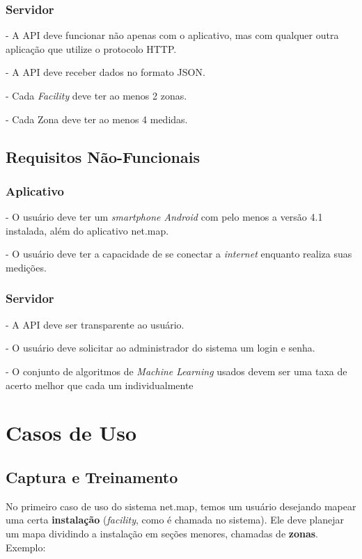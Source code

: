\subsubsection{Servidor}
- A API deve funcionar não apenas com o aplicativo, mas com qualquer outra aplicação que utilize o protocolo HTTP.\par
- A API deve receber dados no formato JSON.\par
- Cada \textit{Facility} deve ter ao menos 2 zonas.\par
- Cada Zona deve ter ao menos 4 medidas.\par


\subsection{Requisitos Não-Funcionais}

\subsubsection{Aplicativo}
- O usuário deve ter um \textit{smartphone Android} com pelo menos a versão 4.1 instalada, além do aplicativo net.map.\par
- O usuário deve ter a capacidade de se conectar a \textit{internet} enquanto realiza suas medições.
\subsubsection{Servidor}
- A API deve ser transparente ao usuário.\par
- O usuário deve solicitar ao administrador do sistema um login e senha.\par
- O conjunto de algoritmos de \textit{Machine Learning} usados devem ser uma taxa de acerto melhor que cada um individualmente \cite{comparativeEN}


\section{Casos de Uso}

\subsection{Captura e Treinamento}

No primeiro caso de uso do sistema net.map, temos um usuário desejando mapear uma certa \textbf{instalação} (\textit{facility}, como é chamada no sistema). Ele deve planejar um mapa dividindo a instalação em seções menores, chamadas de \textbf{zonas}. Exemplo:

